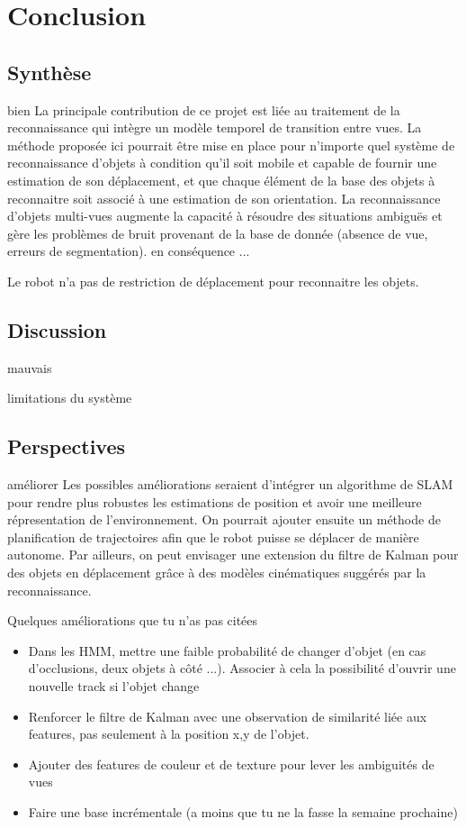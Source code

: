 \chapter{Conclusion}

\section{Synthèse}  bien
La principale contribution de ce projet est liée au traitement de la reconnaissance qui intègre un modèle temporel de transition entre vues. La méthode proposée ici pourrait être mise en place pour n'importe quel système de reconnaissance d'objets à condition qu'il soit mobile et capable de fournir une estimation de son déplacement, et que chaque élément de la base des objets à reconnaitre soit associé à une estimation de son orientation. La reconnaissance d'objets multi-vues augmente la capacité à résoudre des situations ambiguës et gère les problèmes de bruit provenant de la base de donnée (absence de vue, erreurs de segmentation). en conséquence ...

Le robot n'a pas de restriction de déplacement pour reconnaitre les objets.

\section{Discussion} mauvais

limitations du système

\section{Perspectives} améliorer
Les possibles améliorations seraient d'intégrer un algorithme de SLAM pour rendre plus robustes les estimations de position et avoir une meilleure répresentation de l'environnement. On pourrait ajouter ensuite un méthode de planification de trajectoires afin que le robot puisse se déplacer de manière autonome. Par ailleurs, on peut envisager une extension du filtre de Kalman pour des objets en déplacement grâce à des modèles cinématiques suggérés par la reconnaissance.

\color[rgb]{1,0,0}
{
Quelques améliorations que tu n'as pas citées
\begin{itemize}
\item Dans les HMM, mettre une faible probabilité de changer d'objet (en cas d'occlusions, deux objets à côté ...). Associer à cela la possibilité d'ouvrir une nouvelle track si l'objet change
\item Renforcer le filtre de Kalman avec une observation de similarité liée aux features, pas seulement à la position x,y de l'objet.
\item Ajouter des features de couleur et de texture pour lever les ambiguités de vues
\item Faire une base incrémentale (a moins que tu ne la fasse la semaine prochaine)
\end{itemize}
 }
\color[rgb]{0,0,0}






